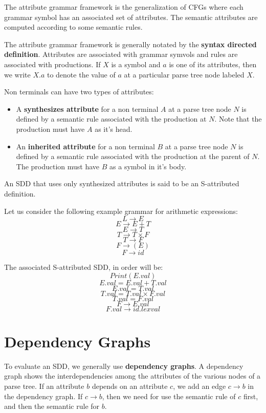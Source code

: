 \documentclass[12pt,letterpaper]{amsbook}
\theoremstyle{definition}
\begin{document}
The attribute grammar framework is the generalization of CFGs where each grammar symbol has an associated set of attributes. The semantic attributes are computed according to some semantic rules.

The attribute grammar framework is generally notated by the \textbf{syntax directed definition}. Attributes are associated with grammar symvols and rules are associated with productions. If $X$ is a symbol and $a$ is one of its attributes, then we write $X.a$ to denote the value of $a$ at a particular parse tree node labeled $X$.

Non terminals can have two types of attributes:

\begin{itemize}
  \item A \textbf{synthesizes attribute} for a non terminal $A$ at a parse tree node $N$ is defined by a semantic rule associated with the production at $N$. Note that the production must have $A$ as it's head.
  \item An \textbf{inherited attribute} for a non terminal $B$ at a parse tree node $N$ is defined by a semantic rule associated with the production at the parent of $N$. The production must have $B$ as a symbol in it's body.
\end{itemize}

An SDD that uses only synthesized attributes is said to be an S-attributed definition.

Let us consider the following example grammar for arithmetic expressions:
\[L \rightarrow E\]
\[E \rightarrow E + T\]
\[E \rightarrow T\]
\[T \rightarrow T \times F\]
\[T \rightarrow F\]
\[F \rightarrow (E)\]
\[F \rightarrow id\]

The associated S-attributed SDD, in order will be:
\[Print(E.val)\]
\[E.val = E.val + T.val\]
\[E.val = T.val\]
\[T.val = T.val \times F.val\]
\[T.val = F.val\]
\[F \rightarrow E.val\]
\[F.val \rightarrow id.lexval\]

\section{Dependency Graphs}

To evaluate an SDD, we generally use \textbf{dependency graphs}. A dependency graph shows the interdependencies among the attributes of the various nodes of a parse tree. If an attribute $b$ depends on an attribute $c$, we add an edge $c \rightarrow b$ in the dependency graph. If $c \rightarrow b$, then we need for use the semantic rule of $c$ first, and then the semantic rule for $b$.
\end{document}
